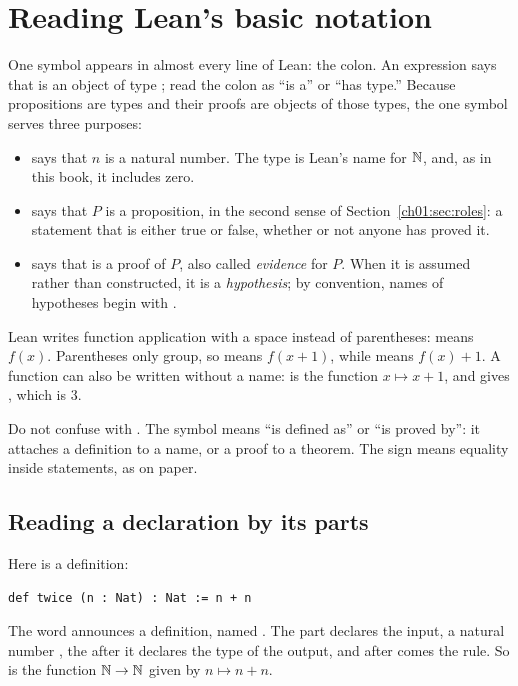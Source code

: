 \section{Reading Lean's basic notation}\label{ch15:sec:symbols}
One symbol appears in almost every line of Lean: the colon. An expression  says that  is an object of type ; read the colon as ``is a'' or ``has type.'' Because propositions are types and their proofs are objects of those types, the one symbol serves three purposes:
\begin{itemize}
\item {} says that $n$ is a natural number. The type  is Lean's name for $\mathbb N$, and, as in this book, it includes zero.
\item {} says that $P$ is a proposition, in the second sense of Section~\ref{ch01:sec:roles}: a statement that is either true or false, whether or not anyone has proved it.
\item {} says that  is a proof of $P$, also called \emph{evidence} for $P$. When it is assumed rather than constructed, it is a \emph{hypothesis}; by convention, names of hypotheses begin with .
\end{itemize}

Lean writes function application with a space instead of parentheses:  means $f(x)$. Parentheses only group, so  means $f(x+1)$, while  means $f(x)+1$. A function can also be written without a name:  is the function $x\mapsto x+1$, and  gives , which is $3$.

Do not confuse \code{:=} with \code{=}. The symbol \code{:=} means ``is defined as'' or ``is proved by'': it attaches a definition to a name, or a proof to a theorem. The sign \code{=} means equality inside statements, as on paper.

\subsection*{Reading a declaration by its parts}
Here is a definition:
\par\noindent\begin{minipage}{\linewidth}
\begin{lstlisting}
def twice (n : Nat) : Nat := n + n
\end{lstlisting}
\end{minipage}\par
The word  announces a definition, named . The part  declares the input, a natural number , the  after it declares the type of the output, and after \code{:=} comes the rule. So  is the function $\mathbb N\to\mathbb N$ given by $n\mapsto n+n$.

